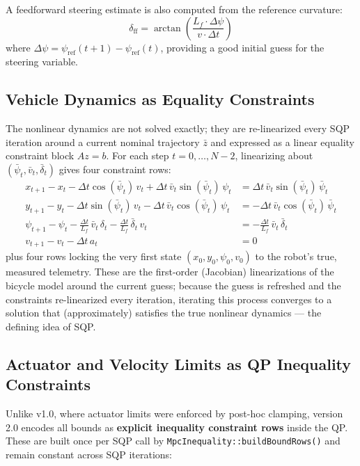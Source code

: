 ﻿\documentclass[11pt,a4paper]{article}
\begin{document}
A feedforward steering estimate is also computed from the reference curvature:
\begin{equation}
\delta_{\text{ff}} = \arctan\!\left(\frac{L_f \cdot \Delta\psi}{v \cdot \Delta t}\right)
\end{equation}
where $\Delta\psi = \psi_{\text{ref}}(t+1) - \psi_{\text{ref}}(t)$, providing a good initial guess for the steering variable.

\subsection{Vehicle Dynamics as Equality Constraints}
The nonlinear dynamics are not solved exactly; they are re-linearized every SQP iteration around a current nominal trajectory $\bar z$ and expressed as a linear equality constraint block $A z = b$. For each step $t=0,\dots,N-2$, linearizing about $(\bar\psi_t, \bar v_t, \bar\delta_t)$ gives four constraint rows:
\begin{align}
x_{t+1} - x_t - \Delta t\cos(\bar\psi_t)\,v_t + \Delta t\, \bar v_t\sin(\bar\psi_t)\,\psi_t &= \Delta t\,\bar v_t \sin(\bar\psi_t)\,\bar\psi_t \nonumber\\
y_{t+1} - y_t - \Delta t\sin(\bar\psi_t)\,v_t - \Delta t\, \bar v_t\cos(\bar\psi_t)\,\psi_t &= -\Delta t\,\bar v_t \cos(\bar\psi_t)\,\bar\psi_t \nonumber\\
\psi_{t+1} - \psi_t - \frac{\Delta t}{L_f}\,\bar v_t\,\delta_t - \frac{\Delta t}{L_f}\,\bar\delta_t\,v_t &= -\frac{\Delta t}{L_f}\,\bar v_t\,\bar\delta_t \nonumber\\
v_{t+1} - v_t - \Delta t\, a_t &= 0
\end{align}
plus four rows locking the very first state $(x_0,y_0,\psi_0,v_0)$ to the robot's true, measured telemetry. These are the first-order (Jacobian) linearizations of the bicycle model around the current guess; because the guess is refreshed and the constraints re-linearized every iteration, iterating this process converges to a solution that (approximately) satisfies the true nonlinear dynamics --- the defining idea of SQP.

\subsection{Actuator and Velocity Limits as QP Inequality Constraints}
Unlike v1.0, where actuator limits were enforced by post-hoc clamping, version 2.0 encodes all bounds as \textbf{explicit inequality constraint rows} inside the QP. These are built once per SQP call by \texttt{MpcInequality::buildBoundRows()} and remain constant across SQP iterations:
\end{document}
